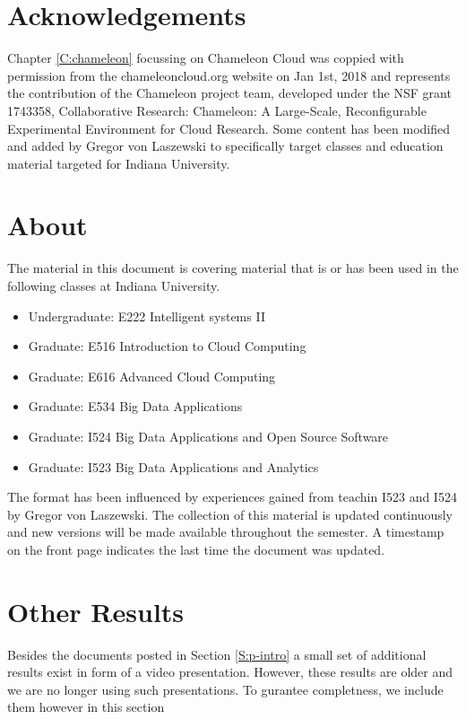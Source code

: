 \section{Acknowledgements}

Chapter \ref{C:chameleon} focussing on Chameleon Cloud was coppied
with permission from the chameleoncloud.org website on Jan 1st, 2018 and
represents the contribution of the Chameleon project team, developed
under the NSF grant 1743358, Collaborative Research: Chameleon: A
Large-Scale, Reconfigurable Experimental Environment for Cloud
Research. Some content has been modified and added by Gregor von
Laszewski to specifically target classes and education material
targeted for Indiana University.

\section{About}

The material in this document is covering material that is or has been
used in the following classes at Indiana University.

\begin{itemize}
\item Undergraduate: E222 Intelligent systems II
\item Graduate: E516 Introduction to Cloud Computing
\item Graduate: E616 Advanced Cloud Computing
\item Graduate: E534 Big Data Applications
\item Graduate: I524 Big Data Applications and Open Source Software
\item Graduate: I523 Big Data Applications and Analytics
\end{itemize}

The format has been influenced by experiences gained from teachin I523
and I524 by Gregor von Laszewski.  The collection of this material is
updated continuously and new versions will be made available
throughout the semester. A timestamp on the front page indicates the
last time the document was updated.

\section{Other Results}\label{S:results}

Besides the documents posted in Section \ref{S:p-intro} a small set of
additional results exist in form of a video presentation.  However,
these results are older and we are no longer using such
presentations. To gurantee completness, we include them however in
this section

